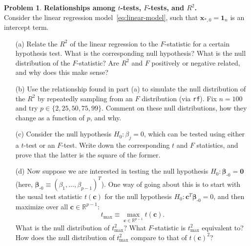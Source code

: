 \documentclass[11pt,letterpaper,english,oneside]{article} %
\theoremstyle{definition} %
\newtheorem{problem}{Problem}
\newenvironment{prob}{\clearpage \begin{problem}\hspace{0pt}}{\end{problem}}
\begin{document}
    \begin{prob} \textbf{Relationships among $t$-tests, $F$-tests, and $R^2$.} \\
    
    \noindent Consider the linear regression model~\eqref{eq:linear-model}, such that $\bm x_{*,0} = \bm 1_n$ is an intercept term.
    
    \begin{itemize}
    \item[(a)] Relate the $R^2$ of the linear regression to the $F$-statistic for a certain hypothesis test. What is the corresponding null hypothesis? What is the null distribution of the $F$-statistic? Are $R^2$ and $F$ positively or negative related, and why does this make sense?
    
    \item[(b)] Use the relationship found in part (a) to simulate the null distribution of the $R^2$ by repeatedly sampling from an $F$ distribution (via \verb|rf|). Fix $n = 100$ and try $p \in \{2, 25, 50, 75, 99\}$. Comment on these null distributions, how they change as a function of $p$, and why. 
    
    \item[(c)] Consider the null hypothesis $H_0: \beta_j = 0$, which can be tested using either a $t$-test or an $F$-test. Write down the corresponding $t$ and $F$ statistics, and prove that the latter is the square of the former. 
    
    \item[(d)] Now suppose we are interested in testing the null hypothesis $H_0: \bm \beta_{\text{-}0} = \bm 0$ (here, $\bm \beta_{\text{-}0} \equiv (\beta_1, \dots, \beta_{p-1})^T$). One way of going about this is to start with the usual test statistic $t(\bm c)$ for the null hypothesis $H_0: \bm c^T \bm \beta_{\text{-}0} = 0$, and then maximize over all $\bm c \in \mathbb R^{p-1}$:
    \begin{equation}
    t_{\max} \equiv \max_{\bm c \in \mathbb R^{p-1}} t(\bm c).
    \end{equation}
    What is the null distribution of $t_{\max}^2$? What $F$-statistic is $t_{\max}^2$ equivalent to? How does the null distribution of $t_{\max}^2$ compare to that of $t(\bm c)^2$?
    
    \end{itemize}
    
    \end{prob}
\end{document}
